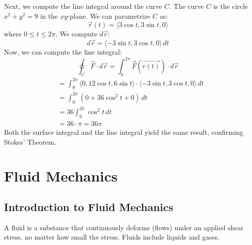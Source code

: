 \documentclass[11pt]{report}
\begin{document}
\begin{example}
Next, we compute the line integral around the curve \(C\). The curve \(C\) is the circle \(x^2 + y^2 = 9\) in the \(xy\)-plane. We can parametrize \(C\) as:
\[\vec{r}(t) = \langle 3 \cos t, 3 \sin t, 0 \rangle\]
where \(0 \leq t \leq 2\pi\).
We compute \(d\vec{r}\):
\[d\vec{r} = \langle -3 \sin t, 3 \cos t, 0 \rangle \, dt\]
Now, we can compute the line integral:
\[\oint_C \vec{F} \cdot d\vec{r} = \int_0^{2\pi} \vec{F}(\vec{r(t)}) \cdot d\vec{r}\]
\begin{align*}
&= \int_0^{2\pi} \langle 0, 12 \cos t, 6 \sin t \rangle \cdot \langle -3 \sin t, 3 \cos t, 0 \rangle \, dt \\   
&= \int_0^{2\pi} (0 + 36 \cos^2 t + 0) \, dt \\
&= 36 \int_0^{2\pi} \cos^2 t \, dt \\
&= 36 \cdot \pi = 36\pi
\end{align*}        
Both the surface integral and the line integral yield the same result, confirming Stokes' Theorem.
\end{example}

\chapter{Fluid Mechanics}
\section{Introduction to Fluid Mechanics}
\begin{definition}[Fluid]
    A fluid is a substance that continuously deforms (flows) under an applied shear stress, no matter how small the stress. Fluids include liquids and gases.
    
\end{definition}
\end{document}
